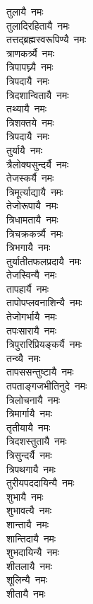 \begin{flushleft}
\begin{multicols}{2}
तुलायै~नमः\\
तुलादिरहितायै~नमः\\
तत्तद्ब्रह्मस्वरूपिण्यै~नमः\\
त्राणकर्त्र्यै~नमः\hfill{}\\
त्रिपापघ्न्यै~नमः\\
त्रिपदायै~नमः\\
त्रिदशान्वितायै~नमः\\
तथ्यायै~नमः\\
त्रिशक्तये~नमः\\
त्रिपदायै~नमः\\
तुर्यायै~नमः\\
त्रैलोक्यसुन्दर्यै~नमः\\
तेजस्कर्यै~नमः\\
त्रिमूर्त्याद्यायै~नमः\hfill{}\\
तेजोरूपायै~नमः\\
त्रिधामतायै~नमः\\
त्रिचक्रकर्त्र्यै~नमः\\
त्रिभगायै~नमः\\
तुर्यातीतफलप्रदायै~नमः\\
तेजस्विन्यै~नमः\\
तापहार्यै~नमः\\
तापोपप्लवनाशिन्यै~नमः\\
तेजोगर्भायै~नमः\\
तपःसारायै~नमः\hfill{}\\
त्रिपुरारिप्रियङ्कर्यै~नमः\\
तन्व्यै~नमः\\
तापससन्तुष्टायै~नमः\\
तपताङ्गजभीतिनुदे~नमः\\
त्रिलोचनायै~नमः\\
त्रिमार्गायै~नमः\\
तृतीयायै~नमः\\
त्रिदशस्तुतायै~नमः\\
त्रिसुन्दर्यै~नमः\\
त्रिपथगायै~नमः\hfill{}\\
तुरीयपददायिन्यै~नमः\\
शुभायै~नमः\\
शुभावत्यै~नमः\\
शान्तायै~नमः\\
शान्तिदायै~नमः\\
शुभदायिन्यै~नमः\\
शीतलायै~नमः\\
शूलिन्यै~नमः\\
शीतायै~नमः\\

\end{multicols}
\end{flushleft}
